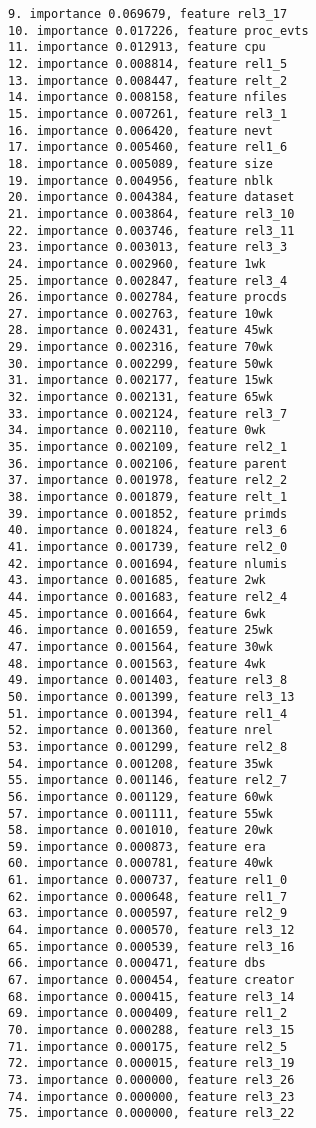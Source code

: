 \begin{verbatim}
9. importance 0.069679, feature rel3_17
10. importance 0.017226, feature proc_evts
11. importance 0.012913, feature cpu
12. importance 0.008814, feature rel1_5
13. importance 0.008447, feature relt_2
14. importance 0.008158, feature nfiles
15. importance 0.007261, feature rel3_1
16. importance 0.006420, feature nevt
17. importance 0.005460, feature rel1_6
18. importance 0.005089, feature size
19. importance 0.004956, feature nblk
20. importance 0.004384, feature dataset
21. importance 0.003864, feature rel3_10
22. importance 0.003746, feature rel3_11
23. importance 0.003013, feature rel3_3
24. importance 0.002960, feature 1wk
25. importance 0.002847, feature rel3_4
26. importance 0.002784, feature procds
27. importance 0.002763, feature 10wk
28. importance 0.002431, feature 45wk
29. importance 0.002316, feature 70wk
30. importance 0.002299, feature 50wk
31. importance 0.002177, feature 15wk
32. importance 0.002131, feature 65wk
33. importance 0.002124, feature rel3_7
34. importance 0.002110, feature 0wk
35. importance 0.002109, feature rel2_1
36. importance 0.002106, feature parent
37. importance 0.001978, feature rel2_2
38. importance 0.001879, feature relt_1
39. importance 0.001852, feature primds
40. importance 0.001824, feature rel3_6
41. importance 0.001739, feature rel2_0
42. importance 0.001694, feature nlumis
43. importance 0.001685, feature 2wk
44. importance 0.001683, feature rel2_4
45. importance 0.001664, feature 6wk
46. importance 0.001659, feature 25wk
47. importance 0.001564, feature 30wk
48. importance 0.001563, feature 4wk
49. importance 0.001403, feature rel3_8
50. importance 0.001399, feature rel3_13
51. importance 0.001394, feature rel1_4
52. importance 0.001360, feature nrel
53. importance 0.001299, feature rel2_8
54. importance 0.001208, feature 35wk
55. importance 0.001146, feature rel2_7
56. importance 0.001129, feature 60wk
57. importance 0.001111, feature 55wk
58. importance 0.001010, feature 20wk
59. importance 0.000873, feature era
60. importance 0.000781, feature 40wk
61. importance 0.000737, feature rel1_0
62. importance 0.000648, feature rel1_7
63. importance 0.000597, feature rel2_9
64. importance 0.000570, feature rel3_12
65. importance 0.000539, feature rel3_16
66. importance 0.000471, feature dbs
67. importance 0.000454, feature creator
68. importance 0.000415, feature rel3_14
69. importance 0.000409, feature rel1_2
70. importance 0.000288, feature rel3_15
71. importance 0.000175, feature rel2_5
72. importance 0.000015, feature rel3_19
73. importance 0.000000, feature rel3_26
74. importance 0.000000, feature rel3_23
75. importance 0.000000, feature rel3_22

\end{verbatim}
